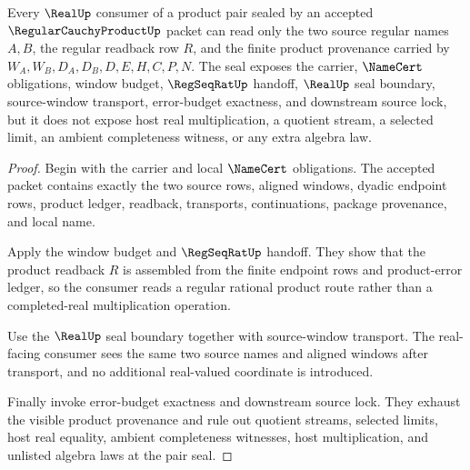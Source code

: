 \begin{theorem}
\label{thm:regular-cauchy-product-real-pair-seal}
Every $\RealUp$ consumer of a product pair sealed by an accepted $\RegularCauchyProductUp$ packet can read only the two source regular names $A,B$, the regular readback row $R$, and the finite product provenance carried by $W_A,W_B,D_A,D_B,D,E,H,C,P,N$. The seal exposes the carrier, $\NameCert$ obligations, window budget, $\RegSeqRatUp$ handoff, $\RealUp$ seal boundary, source-window transport, error-budget exactness, and downstream source lock, but it does not expose host real multiplication, a quotient stream, a selected limit, an ambient completeness witness, or any extra algebra law.
\end{theorem}
\begin{proof}
Begin with the carrier and local $\NameCert$ obligations. The accepted packet contains exactly the two source rows, aligned windows, dyadic endpoint rows, product ledger, readback, transports, continuations, package provenance, and local name.

Apply the window budget and $\RegSeqRatUp$ handoff. They show that the product readback $R$ is assembled from the finite endpoint rows and product-error ledger, so the consumer reads a regular rational product route rather than a completed-real multiplication operation.

Use the $\RealUp$ seal boundary together with source-window transport. The real-facing consumer sees the same two source names and aligned windows after transport, and no additional real-valued coordinate is introduced.

Finally invoke error-budget exactness and downstream source lock. They exhaust the visible product provenance and rule out quotient streams, selected limits, host real equality, ambient completeness witnesses, host multiplication, and unlisted algebra laws at the pair seal.
\end{proof}



